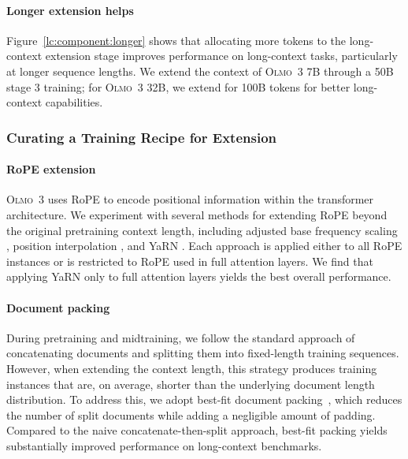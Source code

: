 \documentclass[table]{ai2style/ai2}
\newcommand{\newOlmo}{Olmo\xspace}
\newcommand{\olmothree}{\textsc{\newOlmo~3}\xspace}
\begin{document}
\paragraph{Longer extension helps} Figure~\ref{lc:component:longer} shows that allocating more tokens to the long-context extension stage improves performance on long-context tasks, particularly at longer sequence lengths.
We extend the context of \olmothree 7B through a 50B stage 3 training;
for \olmothree 32B, we extend for 100B tokens for better long-context capabilities.

\subsubsection{Curating a Training Recipe for Extension}
\label{lc:recipe}

\paragraph{RoPE extension} \olmothree uses RoPE \citep{su2024roformer} to encode positional information within the transformer architecture. We experiment with several methods for extending RoPE beyond the original pretraining context length, including adjusted base frequency scaling \citep{xiong2023effectivelongcontextscalingfoundation, rozière2024codellamaopenfoundation}, position interpolation \citep{chen2023extendingcontextwindowlarge}, and YaRN \citep{peng2023yarnefficientcontextwindow}. Each approach is applied either to all RoPE instances or is restricted to RoPE used in full attention layers. We find that applying YaRN only to full attention layers yields the best overall performance.

\paragraph{Document packing} During pretraining and midtraining, we follow the standard approach of concatenating documents and splitting them into fixed-length training sequences. However, when extending the context length, this strategy produces training instances that are, on average, shorter than the underlying document length distribution. To address this, we adopt best-fit document packing~\citep{ding2024fewertruncationsimprovelanguage}, which reduces the number of split documents while adding a negligible amount of padding. Compared to the naive concatenate-then-split approach, best-fit packing yields substantially improved performance on long-context benchmarks.
\end{document}
